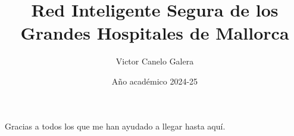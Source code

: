\documentclass[spanish,GINF]{TFGEPSUIB}
\title{Red Inteligente Segura de los Grandes Hospitales de Mallorca}
\author{Victor Canelo Galera}
\date{Año académico 2024-25}
\begin{document}
\portada
\portadainterior
\frontmatter

%
\cleartorecto \thispagestyle{empty}
\begin{agraiments}
Gracias a todos los que me han ayudado a llegar hasta aquí.
\end{agraiments}

\cleartorecto \tableofcontents


 

 

\mainmatter\pagestyle{ruled}














\appendix 
 



\backmatter



 
\end{document}
